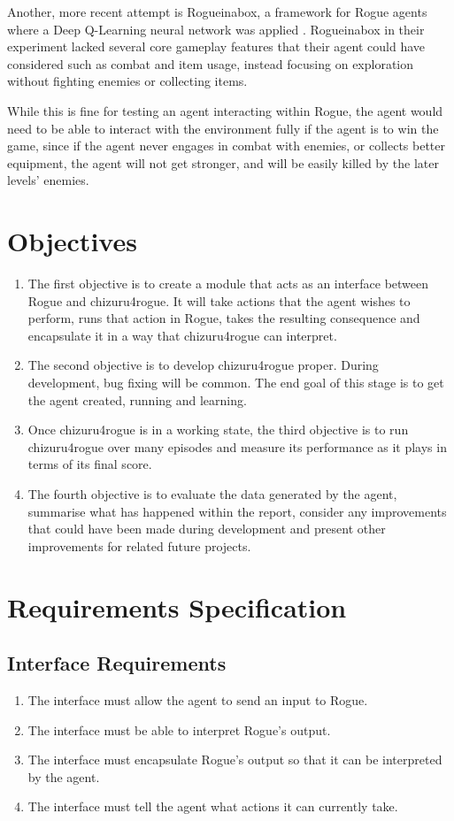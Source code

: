\documentclass[11pt,a4paper]{article}
\begin{document}
Another, more recent attempt is Rogueinabox, a framework for Rogue agents where a Deep Q-Learning neural network was applied \cite[p.149]{asperti17}. Rogueinabox in their experiment lacked several core gameplay features that their agent could have considered such as combat and item usage, instead focusing on exploration without fighting enemies or collecting items.

While this is fine for testing an agent interacting within Rogue, the agent would need to be able to interact with the environment fully if the agent is to win the game, since if the agent never engages in combat with enemies, or collects better equipment, the agent will not get stronger, and will be easily killed by the later levels' enemies.

\section{Objectives}
\begin{enumerate}
	\item The first objective is to create a module that acts as an interface between Rogue and chizuru4rogue. It will take actions that the agent wishes to perform, runs that action in Rogue, takes the resulting consequence and encapsulate it in a way that chizuru4rogue can interpret.
	\item The second objective is to develop chizuru4rogue proper. During development, bug fixing will be common. The end goal of this stage is to get the agent created, running and learning.
	\item Once chizuru4rogue is in a working state, the third objective is to run chizuru4rogue over many episodes and measure its performance as it plays in terms of its final score.
	\item The fourth objective is to evaluate the data generated by the agent, summarise what has happened within the report, consider any improvements that could have been made during development and present other improvements for related future projects.
\end{enumerate}

\section{Requirements Specification}
\subsection{Interface Requirements}
\begin{enumerate}
	\item The interface must allow the agent to send an input to Rogue.
	\item The interface must be able to interpret Rogue's output.
	\item The interface must encapsulate Rogue's output so that it can be interpreted by the agent.
	\item The interface must tell the agent what actions it can currently take.
\end{enumerate}
\end{document}
